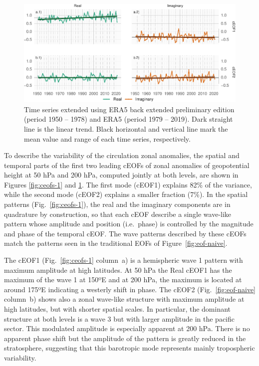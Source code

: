 \documentclass[smallextended]{svjour3}       %
\begin{document}
\begin{figure}
\includegraphics{../figures/extended-series-1} \caption{Time series extended using ERA5 back extended preliminary edition (period 1950 -- 1978) and ERA5 (period 1979 -- 2019). Dark straight line is the linear trend. Black horizontal and vertical line mark the mean value and range of each time series, respectively.}\label{fig:extended-series}
\end{figure}

To describe the variability of the circulation zonal anomalies, the spatial and temporal parts of the first two leading cEOFs of zonal anomalies of geopotential height at 50 hPa and 200 hPa, computed jointly at both levels, are shown in Figures \ref{fig:ceofs-1} and \ref{fig:extended-series}.
The first mode (cEOF1) explains 82\% of the variance, while the second mode (cEOF2) explains a smaller fraction (7\%).
In the spatial patterns (Fig.~\ref{fig:ceofs-1}), the real and the imaginary components are in quadrature by construction, so that each cEOF describe a single wave-like pattern whose amplitude and position (i.e.~phase) is controlled by the magnitude and phase of the temporal cEOF.
The wave patterns described by these cEOFs match the patterns seen in the traditional EOFs of Figure~\ref{fig:eof-naive}.

The cEOF1 (Fig.~\ref{fig:ceofs-1} column~a) is a hemispheric wave 1 pattern with maximum amplitude at high latitudes.
At 50 hPa the Real cEOF1 has the maximum of the wave 1 at 150ºE and at 200 hPa, the maximum is located at around 175ºE indicating a westerly shift in phase.
The cEOF2 (Fig.~\ref{fig:eof-naive} column~b) shows also a zonal wave-like structure with maximum amplitude at high latitudes, but with shorter spatial scales.
In particular, the dominant structure at both levels is a wave 3 but with larger amplitude in the pacific sector.
This modulated amplitude is especially apparent at 200 hPa.
There is no apparent phase shift but the amplitude of the pattern is greatly reduced in the stratosphere, suggesting that this barotropic mode represents mainly tropospheric variability.
\end{document}
